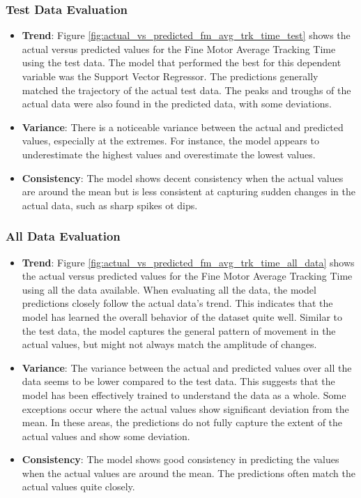 \subsubsection*{Test Data Evaluation}

\begin{itemize}
    \item \textbf{Trend}: Figure \ref{fig:actual_vs_predicted_fm_avg_trk_time_test} shows the actual versus predicted values for the Fine Motor Average Tracking Time using the test data. The model that performed
          the best for this dependent variable was the Support Vector Regressor. The predictions generally matched the trajectory of the actual test data. The peaks and troughs of the
          actual data were also found in the predicted data, with some deviations.
    \item \textbf{Variance}: There is a noticeable variance between the actual and predicted values, especially at the extremes. For instance, the model appears to underestimate the highest values
          and overestimate the lowest values.
    \item \textbf{Consistency}: The model shows decent consistency when the actual values are around the mean but is less consistent at capturing sudden changes in the actual data, such as sharp spikes ot dips.
\end{itemize}

\subsubsection*{All Data Evaluation}

\begin{itemize}
    \item \textbf{Trend}: Figure \ref{fig:actual_vs_predicted_fm_avg_trk_time_all_data} shows the actual versus predicted values for the Fine Motor Average Tracking Time using all the data
          available. When evaluating all the data, the model predictions closely follow the actual data's trend. This indicates that the model has learned the overall behavior of the dataset quite well.
          Similar to the test data, the model captures the general pattern of movement in the actual values, but might not always match the amplitude of changes.
    \item \textbf{Variance}: The variance between the actual and predicted values over all the data seems to be lower compared to the test data. This suggests that the model has been
          effectively trained to understand the data as a whole. Some exceptions occur where the actual values show significant deviation from the mean. In these areas, the predictions do not fully
          capture the extent of the actual values and show some deviation.
    \item \textbf{Consistency}: The model shows good consistency in predicting the values when the actual values are around the mean. The predictions often match the actual values quite closely.
\end{itemize}


